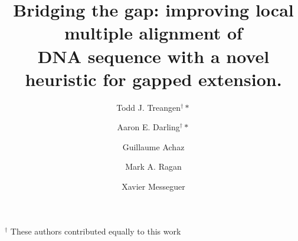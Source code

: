 \documentclass{ws-procs975x65}
\begin{document}
\title{Bridging the gap: improving local multiple alignment of \\DNA sequence with a novel heuristic for gapped extension.}

\author{Todd J. Treangen$^\dag*$}

\address{Dept. of Computer Science, Technical Univ. of Catalonia\\
Barcelona, Spain\\
$^*$E-mail: treangen@lsi.upc.edu}

\author{Aaron E. Darling$^\dag*$}

\address{Institute for Molecular Bioscience, Univ. of Queensland\\
Brisbane, Australia\\
$^*$E-mail: a.darling@imb.uq.edu.au}


\author{Guillaume Achaz}
\address{Atelier de Bioinformatique, Univ. Pierre et Marie Curie-Paris 6,\\
 Paris, France}

\author{ Mark A. Ragan}

\address{Institute for Molecular Bioscience, Univ. of Queensland\\
Brisbane, Australia\\
}

\author{ Xavier Messeguer}

\address{Dept. of Computer Science, Technical Univ. of Catalonia\\
Barcelona, Spain\\
}
\maketitle
{\center \scriptsize $^\dag$ These authors contributed equally to this work \\}


\end{document}
